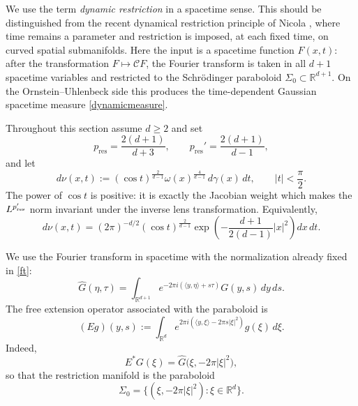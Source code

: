 \documentclass[11pt,a4paper]{amsart}
\def \R {\mathbb{R}}
\numberwithin{equation}{section}
\numberwithin{equation}{section}
\begin{document}
We use the term \emph{dynamic restriction} in a spacetime sense.  This
should be distinguished from the recent dynamical restriction principle
of Nicola \cite{NicolaRestriction}, where time remains a parameter and
restriction is imposed, at each fixed time, on curved spatial
submanifolds.  Here the input is a spacetime function $F(x,t)$: after
the transformation $F\mapsto\mathcal C F$, the Fourier transform is
taken in all $d+1$ spacetime variables and restricted to the
Schr\"odinger paraboloid $\Sigma_0\subset\R^{d+1}$.  On the
Ornstein--Uhlenbeck side this produces the time-dependent Gaussian
spacetime measure \eqref{dynamicmeasure}.

Throughout this section assume $d\ge2$ and set
\begin{equation}
 p_{\mathrm{res}}=\frac{2(d+1)}{d+3},
 \qquad
 p_{\mathrm{res}}'=\frac{2(d+1)}{d-1},
 \label{restrictionexponents}
\end{equation}
and let
\begin{equation}
 d\nu(x,t)
 :=(\cos t)^{\frac{2}{d-1}}
 \omega(x)^{\frac{4}{d-1}}\,d\gamma(x)\,dt,
 \qquad |t|<\frac{\pi}{2}.
 \label{dynamicmeasure}
\end{equation}
The power of $\cos t$ is positive: it is exactly the Jacobian weight which makes the $L^{p_{\rm res}'}$ norm invariant under the inverse lens transformation.  Equivalently,
\begin{equation}
 d\nu(x,t)
 =(2\pi)^{-d/2}(\cos t)^{\frac{2}{d-1}}
 \exp\!\left(-\frac{d+1}{2(d-1)}|x|^2\right)dx\,dt.
 \label{dynamicmeasureLeb}
\end{equation}

We use the Fourier transform in spacetime with the normalization already fixed in \eqref{ft}:
\[
\widehat G(\eta,\tau)
 =\int_{\mathbb R^{d+1}}
 e^{-2\pi i(\langle y,\eta\rangle+s\tau)}G(y,s)\,dy\,ds.
\]
The free extension operator associated with the paraboloid is
\begin{equation}
 (E g)(y,s)
 :=\int_{\mathbb R^d}
 e^{2\pi i(\langle y,\xi\rangle-2\pi s|\xi|^2)}g(\xi)\,d\xi.
 \label{freeextension}
\end{equation}
Indeed,
\begin{equation}
 E^*G(\xi)
 =\widehat G\bigl(\xi,-2\pi|\xi|^2\bigr),
 \label{freeRestriction}
\end{equation}
so that the restriction manifold is the paraboloid
\[
 \Sigma_0=\{(\xi,-2\pi|\xi|^2):\xi\in\mathbb R^d\}.
\]
\end{document}
